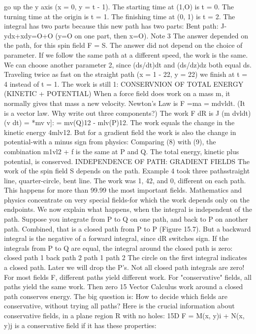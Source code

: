 go up the y axis (x = 0, y = t - 1). The starting time at (1,O) is t = 0. The turning time
at the origin is t = 1. The finishing time at (0, 1) is t = 2. The integral has two parts
because this new path has two parts:
Bent path: J-ydx+xdy=O+O (y=O on one part, then x=O).
Note 3 The answer depended on the path, for this spin field F = S. The answer did
not depend on the choice of parameter. If we follow the same path at a different
speed, the work is the same. We can choose another parameter 2, since (ds/dt)dt and
(ds/dz)dz both equal ds. Traveling twice as fast on the straight path (x = 1 - 22,
y = 22) we finish at t = 4 instead of t = 1. The work is still 1:
CONSERVNION OF TOTAL ENERGY (KINETIC + POTENTIAL)
When a force field does work on a mass m, it normally gives that mass a new velocity.
Newton's Law is F =ma = mdvldt. (It is a vector law. Why write out three components?)
The work F dR is
J (m dvldt) (v dt) = *mv v]: = mv(Q)12 - mlv(P)12.
The work equals the change in the kinetic energy 4mlv12. But for a gradient field the
work is also the change in potential-with a minus sign from physics:
Comparing (8) with (9), the combination m1vl2 + f is the same at P and Q. The total
energy, kinetic plus potential, is conserved.
INDEPENDENCE OF PATH: GRADIENT FIELDS
The work of the spin field S depends on the path. Example 4 took three pathsstraight
line, quarter-circle, bent line. The work was 1, 42, and 0, different on each
path. This happens for more than 99.99%
the most important fields. Mathematics and physics concentrate on very special
fields-for which the work depends only on the endpoints. We now explain what
happens, when the integral is independent of the path.
Suppose you integrate from P to Q on one path, and back to P on another path.
Combined, that is a closed path from P to P (Figure 15.7). But a backward integral
is the negative of a forward integral, since dR switches sign. If the integrals from P
to Q are equal, the integral around the closed path is zero:
closed path 1 back path 2 path 1 path 2
The circle on the first integral indicates a closed path. Later we will drop the P's.
Not all closed path integrals are zero! For most fields F, different paths yield
different work. For "conservative" fields, all paths yield the same work. Then zero 
15 Vector Calculus
work around a closed path conserves energy. The big question is: How to decide
which fields are conservative, without trying all paths? Here is the crucial information
about conservative fields, in a plane region R with no holes:
15D F = M(x, y)i + N(x, y)j is a conservative field if it has these properties:
